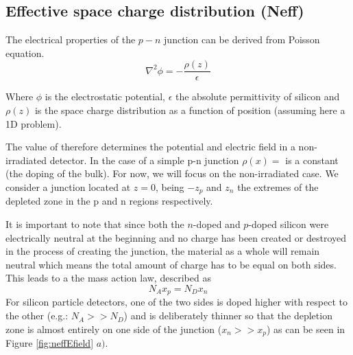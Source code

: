 \subsection{Effective space charge distribution (Neff)} 

The electrical properties of the $p-n$ junction can be derived from Poisson equation. 
\begin{equation}
\nabla^2 \phi = - \frac{\rho(z)}{\epsilon} 
\label{eq:poisson}
\end{equation}

Where $\phi$ is the electrostatic potential, $\epsilon$ the absolute
permittivity of silicon and $\rho(z)$ is the space charge distribution as a
function of position (assuming here a 1D problem).

The value of \neff therefore determines the potential and electric field in a
non-irradiated detector.  In the case of a simple p-n junction $\rho(x) =$\neff 
is a constant (the doping of the bulk). For now, we will focus on the non-irradiated
case. We consider a junction located at $z=0$, being $-z_p$ and $z_n$ the extremes
of the depleted zone in the p and n regions respectively. 

It is important to note that since both the $n$-doped and $p$-doped silicon were
electrically neutral at the beginning and no charge has been created or
destroyed in the process of creating the junction, the material as a whole will
remain neutral which means the total amount of charge has to be equal on both
sides. This leads to a the mass action law, described as \[N_A x_p = N_D x_n\] 
For silicon particle detectors, one of the two sides is doped higher with
respect to the other (e.g.: $N_A >> N_D$) and is deliberately thinner so that 
the depletion zone is almost entirely on one side of the junction ($x_n >> x_p$)
as can be seen in Figure \ref{fig:neffEfield} $a)$. 

